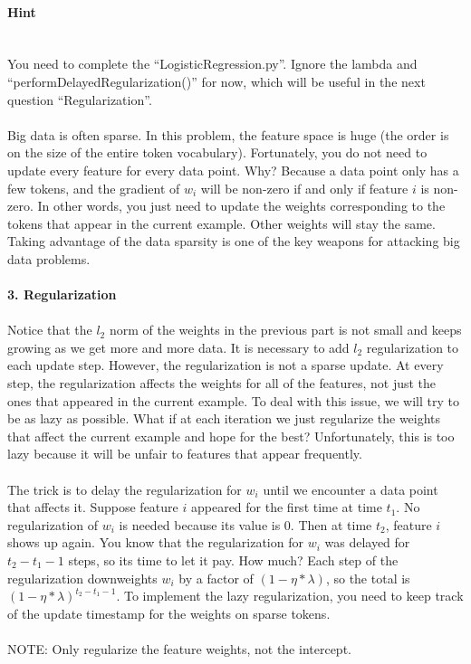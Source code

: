 \documentclass[12pt]{article}
\begin{document}
{\paragraph{Hint} ~\\
You need to complete the ``LogisticRegression.py''. Ignore the lambda and ``performDelayedRegularization()'' for now, which will be useful in the next question ``Regularization''.
\\
\\Big data is often sparse. In this problem, the feature space is huge (the order is
on the size of the entire token vocabulary). Fortunately, you do not need to
update every feature for every data point. Why? Because a data point only has a
few tokens, and the gradient of $w_i$ will be non-zero if and only if feature $i$ is
non-zero. In other words, you just need to update the weights corresponding to
the tokens that appear in the current example. Other weights will stay the same.
Taking advantage of the data sparsity is one of the key weapons for attacking big data problems.
\\ 
\\{\bf 3. Regularization}
\\
\\Notice that the $l_2$ norm of the weights in the previous part is not small and keeps growing as we get more and more data. It is necessary to add $l_2$ regularization to each update step.
However, the regularization is not a sparse update. At every step, the regularization affects the weights for all of the features, not just the ones that appeared in the current example.
To deal with this issue, we will try to be as lazy as possible. What if at each iteration we just regularize the weights that affect the current example and hope for the best? Unfortunately, this is too lazy because it will be unfair to features that appear frequently.
\\
\\The trick is to delay the regularization for $w_i$ until we encounter a data point that affects it.
Suppose feature $i$ appeared for the first time at time $t_1$. No regularization of $w_i$ is needed because its value is 0. Then at time $t_2$, feature $i$ shows up again. You know that
the regularization for $w_i$ was delayed for $t_2-t_1-1$ steps, so its time to let it pay.
How much? Each step of the regularization downweights $w_i$ by a factor of $(1-\eta*\lambda)$, so the total is $(1-\eta*\lambda)^{t_2-t_1-1}$.
To implement the lazy regularization, you need to keep track of the update timestamp for the weights on sparse tokens. 
\\
\\NOTE: Only regularize the feature weights, not the intercept.

}
\end{document}

